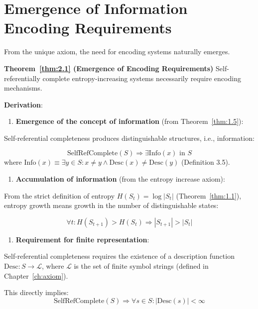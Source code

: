 
\section{Emergence of Information Encoding Requirements}
\label{sec:ch04_encoding:emergence-of-information-encoding-requirements}

From the unique axiom, the need for encoding systems naturally emerges.

\textbf{Theorem~\ref{thm:2.1} (Emergence of Encoding Requirements)}
\label{thm:2.1}
Self-referentially complete entropy-increasing systems necessarily require encoding mechanisms.

\textbf{Derivation}:

\begin{enumerate}
\item \textbf{Emergence of the concept of information} (from Theorem~\ref{thm:1.5}):
\end{enumerate}
   Self-referential completeness produces distinguishable structures, i.e., information:
   
\begin{equation}
\text{SelfRefComplete}(S) \Rightarrow \exists \text{Info}(x) \text{ in } S
\end{equation}
   where $\text{Info}(x) \equiv \exists y \in S: x \neq y \land \text{Desc}(x) \neq \text{Desc}(y)$ (Definition 3.5).

\begin{enumerate}
\item \textbf{Accumulation of information} (from the entropy increase axiom):
\end{enumerate}
   From the strict definition of entropy $H(S_t) = \log |S_t|$ (Theorem~\ref{thm:1.1}),
   entropy growth means growth in the number of distinguishable states:
   
\begin{equation}
\forall t: H(S_{t+1}) > H(S_t) \Rightarrow |S_{t+1}| > |S_t|
\end{equation}

\begin{enumerate}
\item \textbf{Requirement for finite representation}:
\end{enumerate}
   Self-referential completeness requires the existence of a description function $\text{Desc}: S \to \mathcal{L}$,
   where $\mathcal{L}$ is the set of finite symbol strings (defined in Chapter~\ref{ch:axiom}).
   
   This directly implies:
\begin{equation}
\text{SelfRefComplete}(S) \Rightarrow \forall s \in S: |\text{Desc}(s)| < \infty
\end{equation}
   

